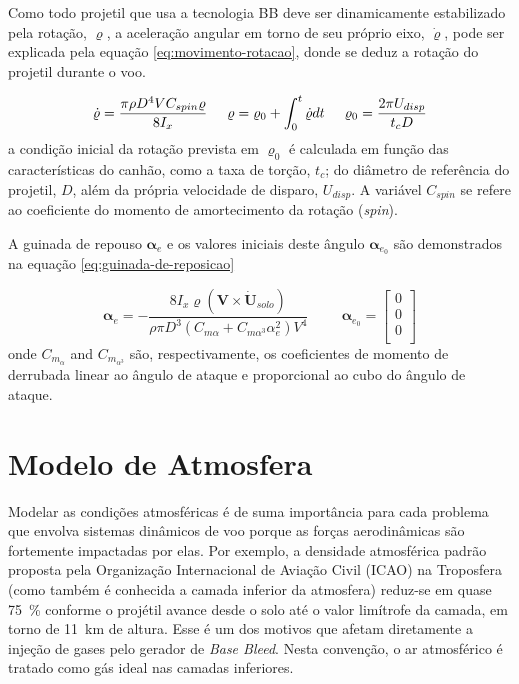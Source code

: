Como todo projetil que usa a tecnologia BB deve ser dinamicamente estabilizado pela rotação, \(\varrho\), a aceleração angular em torno de seu próprio eixo, \(\dot{\varrho}\), pode ser explicada pela equação \ref{eq:movimento-rotacao}, donde se deduz a rotação do projetil durante o voo.

\begin{equation}
    \label{eq:movimento-rotacao}
    \dot{\varrho} = \frac{\pi\rho D^{4}VC_{spin}\varrho}{8I_{x}} 
    \hspace{0.5cm}
    \varrho = \varrho_{0} + \int_{0}^{t}\dot{\varrho}dt 
    \hspace{0.5cm}
    \varrho_{0} = \frac{2\pi U_{disp}}{t_{c}D} 
\end{equation}
%
a condição inicial da rotação prevista em \(\varrho_{0}\) é calculada em função das características do canhão, como a taxa de torção, \(t_c\); do diâmetro de referência do projetil, \(D\), além da própria velocidade de disparo, \(U_{disp}\). A variável \(C_{spin}\) se refere ao coeficiente do momento de amortecimento da rotação (\textit{spin}).

A guinada de repouso \(\boldsymbol{\alpha}_{e}\) e os valores iniciais deste ângulo \(\boldsymbol{\alpha}_{e_{0}}\) são demonstrados na equação \ref{eq:guinada-de-reposicao}

\begin{equation}
	\label{eq:guinada-de-reposicao}
	 \boldsymbol{\alpha}_{e} = -\frac{8I_{x}\varrho(\boldsymbol{V}\times\dot{\boldsymbol{U}}_{solo})}{\rho\pi D^{3}(C_{m\alpha} + C_{m\alpha^{3}}\alpha_{e}^2)V^{4}}
	 \hspace{1cm}
	 \boldsymbol{\alpha}_{e_{0}} =
    \begin{bmatrix} 
        0 \\
        0 \\
        0 \\
    \end{bmatrix}
\end{equation}
%
onde \(C_{m_{\alpha}}\) and \(C_{m_{\alpha^3}}\) são, respectivamente, os coeficientes de momento de derrubada linear ao ângulo de ataque e proporcional ao cubo do ângulo de ataque.

\section{Modelo de Atmosfera}
\label{sec:ICAOatm}

Modelar as condições atmosféricas é de suma importância para cada problema que envolva sistemas dinâmicos de voo porque as forças aerodinâmicas são fortemente impactadas por elas. Por exemplo, a densidade atmosférica padrão proposta pela Organização Internacional de Aviação Civil (ICAO) \cite{international1993manual} na Troposfera (como também é conhecida a camada inferior da atmosfera) reduz-se em quase \qty{75}{\percent} conforme o projétil avance desde o solo até o valor limítrofe da camada, em torno de \qty{11}{\kilo\metre} de altura. Esse é um dos motivos que afetam diretamente a injeção de gases pelo gerador de \textit{Base Bleed}. Nesta convenção, o ar atmosférico é tratado como gás ideal nas camadas inferiores. 

